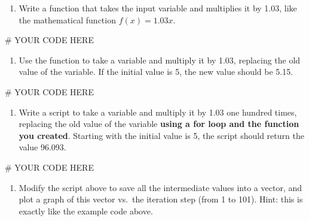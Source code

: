 \documentclass[
  letterpaper,
  DIV=11,
  numbers=noendperiod]{scrreprt}
\newenvironment{Shaded}{\begin{snugshade}}{\end{snugshade}}
\newcommand{\CommentTok}[1]{\textcolor[rgb]{0.37,0.37,0.37}{#1}}
\providecommand{\tightlist}{%
  \setlength{\itemsep}{0pt}\setlength{\parskip}{0pt}}\usepackage{longtable,booktabs,array}
\begin{document}
\begin{enumerate}
\def\labelenumi{\arabic{enumi}.}
\tightlist
\item
  Write a function that takes the input variable and multiplies it by
  1.03, like the mathematical function \(f(x) = 1.03x\).
\end{enumerate}

\begin{Shaded}
\begin{Highlighting}[]
\CommentTok{\# YOUR CODE HERE}
\end{Highlighting}
\end{Shaded}

\begin{enumerate}
\def\labelenumi{\arabic{enumi}.}
\setcounter{enumi}{1}
\tightlist
\item
  Use the function to take a variable and multiply it by 1.03, replacing
  the old value of the variable. If the initial value is 5, the new
  value should be 5.15.
\end{enumerate}

\begin{Shaded}
\begin{Highlighting}[]
\CommentTok{\# YOUR CODE HERE}
\end{Highlighting}
\end{Shaded}

\begin{enumerate}
\def\labelenumi{\arabic{enumi}.}
\setcounter{enumi}{2}
\tightlist
\item
  Write a script to take a variable and multiply it by 1.03 one hundred
  times, replacing the old value of the variable \textbf{using a for
  loop and the function you created}. Starting with the initial value is
  5, the script should return the value 96.093.
\end{enumerate}

\begin{Shaded}
\begin{Highlighting}[]
\CommentTok{\# YOUR CODE HERE}
\end{Highlighting}
\end{Shaded}

\begin{enumerate}
\def\labelenumi{\arabic{enumi}.}
\setcounter{enumi}{3}
\tightlist
\item
  Modify the script above to save all the intermediate values into a
  vector, and plot a graph of this vector vs.~the iteration step (from 1
  to 101). Hint: this is exactly like the example code above.
\end{enumerate}
\end{document}
